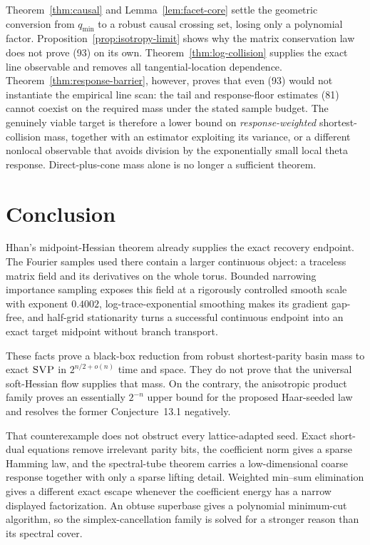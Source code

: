 \documentclass[10pt]{article}
\theoremstyle{definition}
\newcommand{\SVP}{\textnormal{\textsc{SVP}}}
\begin{document}
Theorem~\ref{thm:causal} and Lemma~\ref{lem:facet-core} settle the geometric
conversion from $q_{\min}$ to a robust causal crossing set, losing only a
polynomial factor.  Proposition~\ref{prop:isotropy-limit} shows why the
matrix conservation law does not prove (93) on its own.
Theorem~\ref{thm:log-collision} supplies the exact line observable and removes
all tangential-location dependence.  Theorem~\ref{thm:response-barrier},
however, proves that even (93) would not instantiate the empirical line scan:
the tail and response-floor estimates (81) cannot coexist on the required
mass under the stated sample budget.  The genuinely viable target is
therefore a lower bound on \emph{response-weighted} shortest-collision mass,
together with an estimator exploiting its variance, or a different nonlocal
observable that avoids division by the exponentially small local theta
response.  Direct-plus-cone mass alone is no longer a sufficient theorem.

\section{Conclusion}

Hhan's midpoint-Hessian theorem already supplies the exact recovery endpoint.
The Fourier samples used there contain a larger continuous object: a
traceless matrix field and its derivatives on the whole torus.  Bounded
narrowing importance sampling exposes this field at a rigorously controlled
smooth scale with exponent $0.4002$, log-trace-exponential smoothing makes
its gradient gap-free, and half-grid stationarity turns a successful
continuous endpoint into an exact target midpoint without branch transport.

These facts prove a black-box reduction from robust shortest-parity basin
mass to exact $\SVP$ in $2^{n/2+o(n)}$ time and space.  They do not prove that
the universal soft-Hessian flow supplies that mass.  On the contrary, the
anisotropic product family proves an essentially $2^{-n}$ upper bound for
the proposed Haar-seeded law and resolves the former Conjecture~13.1
negatively.

That counterexample does not obstruct every lattice-adapted seed.  Exact
short-dual equations remove irrelevant parity bits, the coefficient norm
gives a sparse Hamming law, and the spectral-tube theorem carries a
low-dimensional coarse response together with only a sparse lifting detail.
Weighted min--sum elimination gives a different exact escape whenever the
coefficient energy has a narrow displayed factorization.  An obtuse
superbase gives a polynomial minimum-cut algorithm, so the
simplex-cancellation family is solved for a stronger reason than its
spectral cover.
\end{document}
